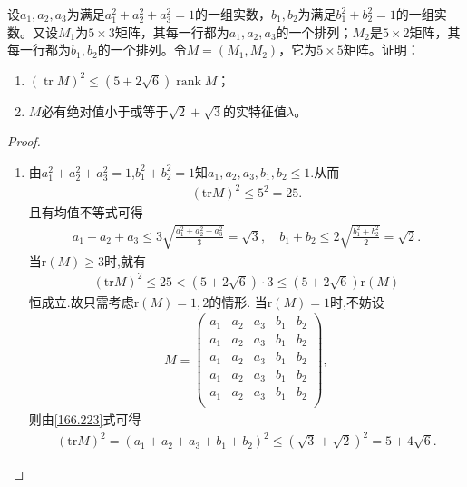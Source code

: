 \documentclass[../../main.tex]{subfiles}
\begin{document}
\begin{example}
设$a_1,a_2,a_3$为满足$a_1^2 + a_2^2 + a_3^2 = 1$的一组实数，$b_1,b_2$为满足$b_1^2 + b_2^2 = 1$的一组实数。又设$M_1$为$5 \times 3$矩阵，其每一行都为$a_1,a_2,a_3$的一个排列；$M_2$是$5 \times 2$矩阵，其每一行都为$b_1,b_2$的一个排列。令$M = (M_1,M_2)$，它为$5 \times 5$矩阵。证明：
\begin{enumerate}[(1)]
\item $(\operatorname{tr} M)^2 \leq (5 + 2\sqrt{6})\operatorname{rank} M$；

\item $M$必有绝对值小于或等于$\sqrt{2} + \sqrt{3}$的实特征值$\lambda$。
\end{enumerate}
\end{example}
\begin{proof}
\begin{enumerate}[(1)]
\item 由$a_{1}^{2}+a_{2}^{2}+a_{3}^{2}=1$,$b_{1}^{2}+b_{2}^{2}=1$知$a_1,a_2,a_3,b_1,b_2\leqslant 1$.从而
\begin{align*}
\left( \mathrm{tr}M \right) ^2\leqslant 5^2=25.
\end{align*}
且有均值不等式可得
\begin{align}
a_1+a_2+a_3\leqslant 3\sqrt{\frac{a_{1}^{2}+a_{2}^{2}+a_{3}^{2}}{3}}=\sqrt{3},\quad b_1+b_2\leqslant 2\sqrt{\frac{b_{1}^{2}+b_{2}^{2}}{2}}=\sqrt{2}.\label{166.223}
\end{align}
当$\mathrm{r}\left( M \right) \geqslant 3$时,就有
\begin{align*}
\left( \mathrm{tr}M \right) ^2\leqslant 25<\left( 5+2\sqrt{6} \right) \cdot 3\leqslant \left( 5+2\sqrt{6} \right) \mathrm{r}\left( M \right)
\end{align*}
恒成立.故只需考虑$\mathrm{r}\left( M \right) =1,2$的情形.
当$\mathrm{r}\left( M \right) =1$时,不妨设
\begin{align*}
M=\begin{pmatrix}
a_1&	a_2&	a_3&	b_1&	b_2\\
a_1&	a_2&	a_3&	b_1&	b_2\\
a_1&	a_2&	a_3&	b_1&	b_2\\
a_1&	a_2&	a_3&	b_1&	b_2\\
a_1&	a_2&	a_3&	b_1&	b_2\\
\end{pmatrix},
\end{align*}
则由\eqref{166.223}式可得
\begin{align*}
\left( \mathrm{tr}M \right) ^2=\left( a_1+a_2+a_3+b_1+b_2 \right) ^2\leqslant \left( \sqrt{3}+\sqrt{2} \right) ^2=5+4\sqrt{6}.

\end{align*}
\end{enumerate}
\end{proof}
\end{document}
